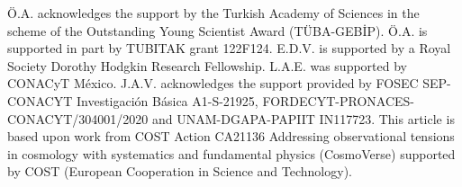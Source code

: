 \documentclass[twocolumn,a4paper,reprint,amssymb,aps,prd,groupedaddress,superscriptaddress,nofootinbib]{revtex4-2}
\begin{document}
\begin{acknowledgments}

\"{O}.A. acknowledges the support by the Turkish Academy of Sciences in the scheme of the Outstanding Young Scientist Award  (T\"{U}BA-GEB\.{I}P). \"{O}.A. is supported in part by TUBITAK grant 122F124. E.D.V. is supported by a Royal Society Dorothy Hodgkin Research Fellowship. L.A.E. was supported by CONACyT M\'exico. J.A.V. acknowledges the support provided by FOSEC SEP-CONACYT Investigaci\'on B\'asica A1-S-21925, FORDECYT-PRONACES-CONACYT/304001/2020 and UNAM-DGAPA-PAPIIT IN117723. This article is based upon work from COST Action CA21136 Addressing observational tensions in cosmology with systematics and fundamental physics (CosmoVerse) supported by COST (European Cooperation in Science and Technology).
\end{acknowledgments}













\end{document}
